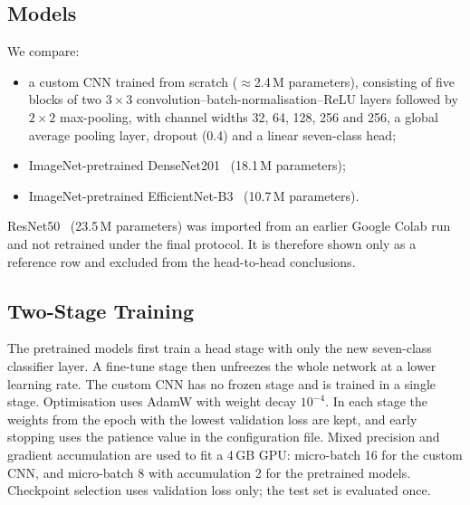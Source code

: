 \documentclass[conference]{IEEEtran}
\begin{document}
\subsection{Models}
We compare:
\begin{itemize}
\item a custom CNN trained from scratch ($\approx$2.4\,M parameters), consisting of five blocks of two $3\times3$ convolution--batch-normalisation--ReLU layers followed by $2\times2$ max-pooling, with channel widths 32, 64, 128, 256 and 256, a global average pooling layer, dropout (0.4) and a linear seven-class head;
\item ImageNet-pretrained DenseNet201~\cite{huang2017} (18.1\,M parameters);
\item ImageNet-pretrained EfficientNet-B3~\cite{tan2019} (10.7\,M parameters).
\end{itemize}
ResNet50~\cite{he2016} (23.5\,M parameters) was imported from an earlier Google Colab run and not retrained under the final protocol. It is therefore shown only as a reference row and excluded from the head-to-head conclusions.

\subsection{Two-Stage Training}
The pretrained models first train a head stage with only the new seven-class classifier layer. A fine-tune stage then unfreezes the whole network at a lower learning rate. The custom CNN has no frozen stage and is trained in a single stage. Optimisation uses AdamW with weight decay $10^{-4}$. In each stage the weights from the epoch with the lowest validation loss are kept, and early stopping uses the patience value in the configuration file. Mixed precision and gradient accumulation are used to fit a 4\,GB GPU: micro-batch 16 for the custom CNN, and micro-batch 8 with accumulation 2 for the pretrained models. Checkpoint selection uses validation loss only; the test set is evaluated once.
\end{document}
